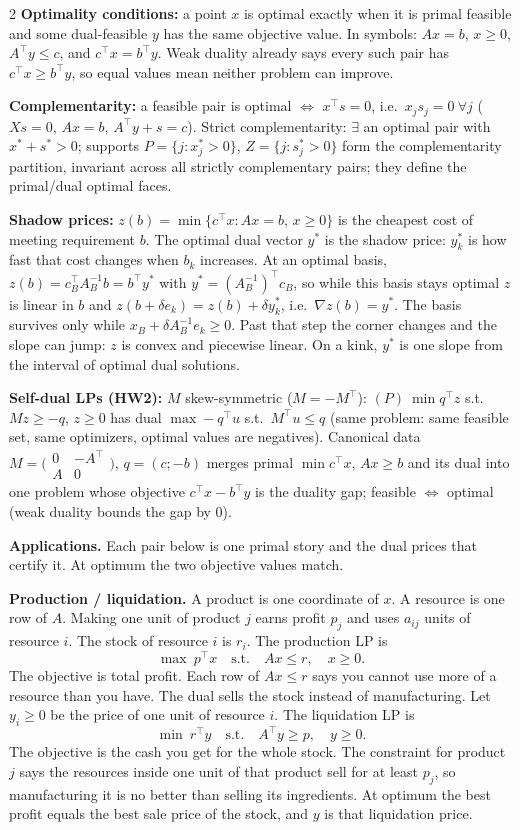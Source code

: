 \documentclass{article}
\newcommand{\kw}[1]{\textbf{#1}}
\begin{document}
\begin{multicols}{2}
\kw{Optimality conditions:} a point $x$ is optimal exactly when it is primal feasible and some dual-feasible $y$ has the same objective value. In symbols: $Ax=b$, $x\ge 0$, $A^\top y\le c$, and $c^\top x=b^\top y$. Weak duality already says every such pair has $c^\top x\ge b^\top y$, so equal values mean neither problem can improve.

\kw{Complementarity:} a feasible pair is optimal $\Leftrightarrow$ $x^\top s=0$, i.e.\ $x_js_j=0\ \forall j$ ($Xs=0$, $Ax=b$, $A^\top y+s=c$). Strict complementarity: $\exists$ an optimal pair with $x^*+s^*>0$; supports $P=\{j:x_j^*>0\}$, $Z=\{j:s_j^*>0\}$ form the complementarity partition, invariant across all strictly complementary pairs; they define the primal/dual optimal faces.

\kw{Shadow prices:} $z(b)=\min\{c^\top x:Ax=b,\,x\ge 0\}$ is the cheapest cost of meeting requirement $b$. The optimal dual vector $y^*$ is the shadow price: $y_k^*$ is how fast that cost changes when $b_k$ increases. At an optimal basis, $z(b)=c_B^\top A_B^{-1}b=b^\top y^*$ with $y^*=(A_B^{-1})^\top c_B$, so while this basis stays optimal $z$ is linear in $b$ and $z(b+\delta e_k)=z(b)+\delta y_k^*$, i.e.\ $\nabla z(b)=y^*$. The basis survives only while $x_B+\delta A_B^{-1}e_k\ge 0$. Past that step the corner changes and the slope can jump: $z$ is convex and piecewise linear. On a kink, $y^*$ is one slope from the interval of optimal dual solutions.

\kw{Self-dual LPs (HW2):} $M$ skew-symmetric ($M=-M^\top$): $(P)\ \min q^\top z$ s.t.\ $Mz\ge -q$, $z\ge 0$ has dual $\max -q^\top u$ s.t.\ $M^\top u\le q$ (same problem: same feasible set, same optimizers, optimal values are negatives). Canonical data $M=\bigl(\begin{smallmatrix}0&-A^\top\\ A&0\end{smallmatrix}\bigr)$, $q=(c;-b)$ merges primal $\min c^\top x$, $Ax\ge b$ and its dual into one problem whose objective $c^\top x-b^\top y$ is the duality gap; feasible $\Leftrightarrow$ optimal (weak duality bounds the gap by $0$).

\kw{Applications.} Each pair below is one primal story and the dual prices that certify it. At optimum the two objective values match.

\kw{Production / liquidation.} A product is one coordinate of $x$. A resource is one row of $A$. Making one unit of product $j$ earns profit $p_j$ and uses $a_{ij}$ units of resource $i$. The stock of resource $i$ is $r_i$. The production LP is
\[
\max\ p^\top x \quad\text{s.t.}\quad Ax\le r,\quad x\ge 0.
\]
The objective is total profit. Each row of $Ax\le r$ says you cannot use more of a resource than you have. The dual sells the stock instead of manufacturing. Let $y_i\ge 0$ be the price of one unit of resource $i$. The liquidation LP is
\[
\min\ r^\top y \quad\text{s.t.}\quad A^\top y\ge p,\quad y\ge 0.
\]
The objective is the cash you get for the whole stock. The constraint for product $j$ says the resources inside one unit of that product sell for at least $p_j$, so manufacturing it is no better than selling its ingredients. At optimum the best profit equals the best sale price of the stock, and $y$ is that liquidation price.


\end{multicols}
\end{document}
